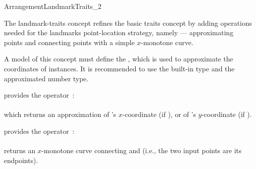 
\ccRefPageBegin

\begin{ccRefConcept}{ArrangementLandmarkTraits_2}

\ccDefinition

The landmark-traits concept refines the basic traits concept by adding
operations needed for the landmarks point-location strategy, namely ---
approximating points and connecting points with a simple $x$-monotone
curve.

A model of this concept must define the , which
is used to approximate the coordinates of  instances. It is
recommended to use the built-in  type and the approximated number
type.

\ccRefines
{}

\ccTypes



\ccThreeToTwo

{provides the operator~: \\
  \\
 which returns an approximation of 's $x$-coordinate (if ),
 or of 's $y$-coordinate (if ).}

{provides the operator~: \\
  \\
 returns an $x$-monotone curve connecting  and  (i.e., the
 two input points are its endpoints).}

\ccCreation
{}

\ccThreeToTwo


\end{ccRefConcept}
